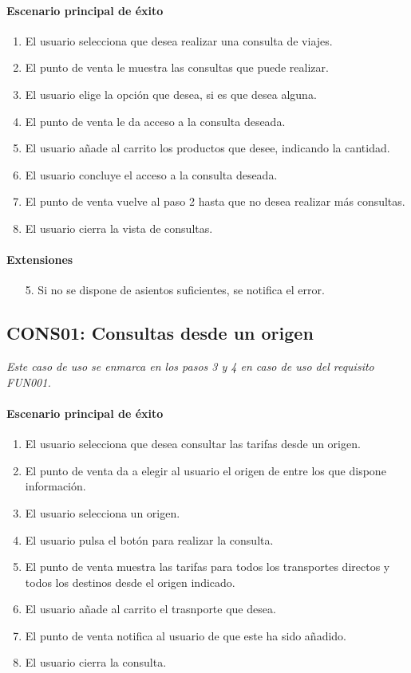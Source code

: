   \paragraph{Escenario principal de éxito}
  \begin{enumerate}
    \item El usuario selecciona que desea realizar una consulta de viajes.
    \item El punto de venta le muestra las consultas que puede realizar.
    \item El usuario elige la opción que desea, si es que desea alguna.
    \item El punto de venta le da acceso a la consulta deseada.
    \item El usuario añade al carrito los productos que desee, indicando la cantidad.
    \item El usuario concluye el acceso a la consulta deseada.
    \item El punto de venta vuelve al paso 2 hasta que no desea realizar más consultas.
    \item El usuario cierra la vista de consultas.
  \end{enumerate}
  \paragraph{Extensiones}
  \begin{enumerate}
    \item[5.] Si no se dispone de asientos suficientes, se notifica el error.
  \end{enumerate}

  \subsection{CONS01: Consultas desde un origen}
    \emph{Este caso de uso se enmarca en los pasos 3 y 4 en caso de uso del requisito FUN001.}
    \paragraph{Escenario principal de éxito}
    \begin{enumerate}
      \item El usuario selecciona que desea consultar las tarifas desde un origen.
      \item El punto de venta da a elegir al usuario el origen de entre los que dispone información.
      \item El usuario selecciona un origen.
      \item El usuario pulsa el botón para realizar la consulta.
      \item El punto de venta muestra las tarifas para todos los transportes directos y todos los destinos desde el origen indicado.
      \item El usuario añade al carrito el trasnporte que desea.
      \item El punto de venta notifica al usuario de que este ha sido añadido.
      \item El usuario cierra la consulta.
    \end{enumerate}


